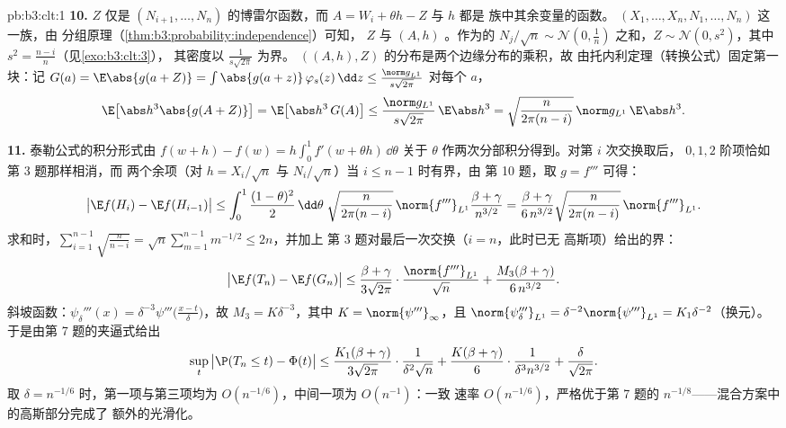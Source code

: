 \begin{solution}{pb:b3:clt:1}
\textbf{10.} $Z$ 仅是 $(N_{i+1}, \dots,
N_n)$ 的博雷尔函数，而 $A = W_i + \theta h - Z$ 与 $h$ 都是
族中其余变量的函数。
$(X_1, \dots, X_n, N_1, \dots, N_n)$ 这一族，由
分组原理（\cref{thm:b3:probability:independence}）可知，
$Z$ 与 $(A, h)$ 。作为的
$N_j/\sqrt n \sim \mathcal N(0, \frac1n)$ 之和，$Z \sim \mathcal
N(0, s^2)$，其中 $s^2 = \frac{n-i}n$（见\cref{exo:b3:clt:3}），
其密度以 $\frac1{s\sqrt{2\pi}}$ 为界。
$((A, h), Z)$ 的分布是两个边缘分布的乘积，故
由托内利定理（转换公式）固定第一块：记 $G(a) =
\E\abs{g(a + Z)} = \int\abs{g(a + z)}\,\varphi_s(z)\,\dd z
\leq \frac{\norm g_{L^1}}{s\sqrt{2\pi}}$ 对每个 $a$，
\[
\E\bigl[\abs h^3\abs{g(A + Z)}\bigr] =
\E\bigl[\abs h^3\,G(A)\bigr] \leq
\frac{\norm g_{L^1}}{s\sqrt{2\pi}}\,\E\abs h^3
= \sqrt{\frac{n}{2\pi(n-i)}}\,\norm g_{L^1}\,\E\abs h^3 .
\]

\textbf{11.} 泰勒公式的积分形式由
$f(w + h) - f(w) =
h\int_0^1f'(w + \theta h)\,\dd\theta$ 关于
$\theta$ 作两次分部积分得到。对第 $i$ 次交换取后，
$0, 1, 2$ 阶项恰如第 3 题那样相消，而
两个余项（对 $h = X_i/\sqrt n$
与 $N_i/\sqrt n$）当 $i \leq n - 1$ 时有界，由
第 10 题，取 $g = f'''$ 可得：
\[
\bigl|\E f(H_i) - \E f(H_{i-1})\bigr| \leq
\int_0^1\frac{(1-\theta)^2}2\,\dd\theta\;
\sqrt{\frac{n}{2\pi(n-i)}}\,\norm{f'''}_{L^1}
\frac{\beta + \gamma}{n^{3/2}}
= \frac{\beta + \gamma}{6\,n^{3/2}}
\sqrt{\frac{n}{2\pi(n-i)}}\,\norm{f'''}_{L^1} .
\]
求和时，$\sum_{i=1}^{n-1}\sqrt{\frac n{n-i}} =
\sqrt n\sum_{m=1}^{n-1}m^{-1/2} \leq 2n$，并加上
第 3 题对最后一次交换（$i = n$，此时已无
高斯项）给出的界：
\[
\bigl|\E f(T_n) - \E f(G_n)\bigr| \leq
\frac{\beta + \gamma}{3\sqrt{2\pi}}\cdot
\frac{\norm{f'''}_{L^1}}{\sqrt n} +
\frac{M_3(\beta + \gamma)}{6\,n^{3/2}} .
\]
斜坡函数：$\psi_\delta'''(x) =
\delta^{-3}\psi'''\bigl(\frac{x - t}\delta\bigr)$，故
$M_3 = K\delta^{-3}$，其中 $K = \norm{\psi'''}_\infty$，且
$\norm{\psi_\delta'''}_{L^1} = \delta^{-2}
\norm{\psi'''}_{L^1} = K_1\delta^{-2}$（换元）。
于是由第 7 题的夹逼式给出
\[
\sup_t\,\bigl|\P(T_n \leq t) - \Phi(t)\bigr| \leq
\frac{K_1(\beta + \gamma)}{3\sqrt{2\pi}}\cdot
\frac1{\delta^2\sqrt n} +
\frac{K(\beta + \gamma)}{6}\cdot
\frac1{\delta^3n^{3/2}} + \frac\delta{\sqrt{2\pi}} .
\]
取 $\delta = n^{-1/6}$ 时，第一项与第三项均为
$O(n^{-1/6})$，中间一项为 $O(n^{-1})$：一致
速率 $O(n^{-1/6})$，严格优于第 7 题的
$n^{-1/8}$——混合方案中的高斯部分完成了
额外的光滑化。


\end{solution}
